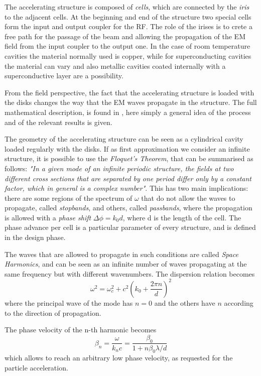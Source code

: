 The accelerating structure is composed of \textit{cells}, which are connected by the \textit{iris} to the adjacent cells. At the beginning and end of the structure two special cells form the input and output coupler for the RF. The role of the irises is to crete a free path for the passage of the beam and allowing the propagation of the EM field from the input coupler to the output one. In the case of room temperature cavities the material normally used is copper, while for superconducting cavities the material can vary and also metallic cavities coated internally with a superconductive layer are a possibility.

From the field perspective, the fact that the accelerating structure is loaded with the disks changes the way that the EM waves propagate in the structure. The full mathematical description, is found in \cite{Weiss:261732, Jackson:ClassEM}, here simply a general idea of the process and of the relevant results is given.

The geometry of the accelerating structure can be seen as a cylindrical cavity loaded regularly with the disks. If as first approximation we consider an infinite structure, it is possible to use the \textit{Floquet's Theorem}, that can be summarised as follows: \textit{"In a given mode of an infinite periodic structure, the fields at two different cross sections that are separated by one period differ only by a constant factor, which in general is a complex number"}. This has two main implications: there are some regions of the spectrum of $\omega$ that do not allow the waves to propagate, called \textit{stopbands}, and others, called \textit{passbands}, where the propagation is allowed with a \textit{phase shift} $\Delta \phi = k_0 d$, where d is the length of the cell. The phase advance per cell is a particular parameter of every structure, and is defined in the design phase.

The waves that are allowed to propagate in such conditions are called \textit{Space Harmonics}, and can be seen as an infinite number of waves propagating at the same frequency but with different wavenumbers. The dispersion relation becomes
\begin{equation}
\omega ^2 = \omega^2_c + c^2 \left( k_0 + \frac{2\pi n}{d} \right)^2
\end{equation}
where the principal wave of the mode has $n=0$ and the others have $n$ according to the direction of propagation.

The phase velocity of the n-th harmonic becomes
\begin{equation}
\beta_n = \frac{\omega}{k_n c} = \frac{\beta_0}{1+n\beta_0 \lambda/d}
\end{equation}
which allows to reach an arbitrary low phase velocity, as requested for the particle acceleration.

